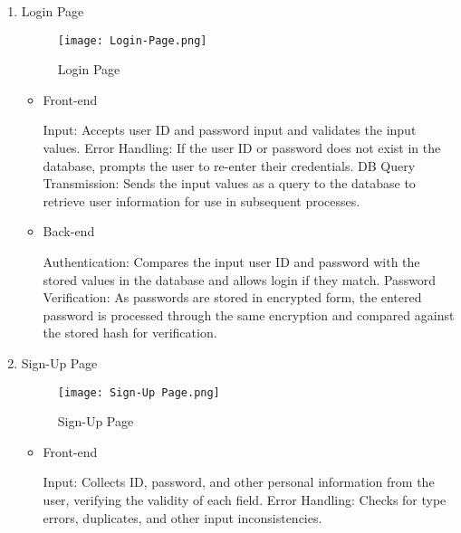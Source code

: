 \documentclass[conference]{IEEEtran}
\begin{document}
\begin{enumerate}
\setlength{\parindent}{2ex}
\item Login Page

\begin{figure}[H]
    \centering
    \texttt{[image: Login-Page.png]}
    \caption{Login Page}
    \label{fig:Login Page}
\end{figure}

\begin{itemize}
\setlength{\parindent}{2ex}
\item Front-end

Input: Accepts user ID and password input and validates the input values. \newline\hspace*{1.2ex}
Error Handling: If the user ID or password does not exist in the database, prompts the user to re-enter their credentials.\newline\hspace*{1.2ex}
DB Query Transmission: Sends the input values as a query to the database to retrieve user information for use in subsequent processes.

\vspace{0.6cm}
\item Back-end

Authentication: Compares the input user ID and password with the stored values in the database and allows login if they match. \newline\hspace*{1.2ex}
Password Verification: As passwords are stored in encrypted form, the entered password is processed through the same encryption and compared against the stored hash for verification.

\end{itemize}

\item Sign-Up Page

\begin{figure}[H]
    \centering
    \texttt{[image: Sign-Up Page.png]}
    \caption{Sign-Up Page}
    \label{fig:Sign-Up Page}
\end{figure}

\begin{itemize}
\setlength{\parindent}{2ex}
\item Front-end

Input: Collects ID, password, and other personal information from the user, verifying the validity of each field. \newline\hspace*{1.2ex}
Error Handling: Checks for type errors, duplicates, and other input inconsistencies.


\end{itemize}
\end{enumerate}
\end{document}
